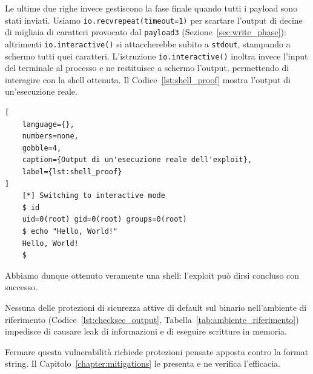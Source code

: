Le ultime due righe invece gestiscono la fase finale quando tutti i payload sono stati inviati. Usiamo \texttt{io.recvrepeat(timeout=1)} per scartare l'output di decine di migliaia di caratteri provocato dal \texttt{payload3} (Sezione~\ref{sec:write_phase}): altrimenti \texttt{io.interactive()} si attaccherebbe subito a \texttt{stdout}, stampando a schermo tutti quei caratteri. L'istruzione \texttt{io.interactive()} inoltra invece l'input del terminale al processo e ne restituisce a schermo l'output, permettendo di interagire con la shell ottenuta. Il Codice~\ref{lst:shell_proof} mostra l'output di un'esecuzione reale.
\begin{lstlisting}[
    language={},
    numbers=none,
    gobble=4,
    caption={Output di un'esecuzione reale dell'exploit},
    label={lst:shell_proof}
]
    [*] Switching to interactive mode
    $ id
    uid=0(root) gid=0(root) groups=0(root)
    $ echo "Hello, World!"
    Hello, World!
    $  
\end{lstlisting}
Abbiamo dunque ottenuto veramente una shell: l'exploit può dirsi concluso con successo.

Nessuna delle protezioni di sicurezza attive di default sul binario nell'ambiente di riferimento (Codice~\ref{lst:checksec_output}, Tabella~\ref{tab:ambiente_riferimento})  impedisce di causare leak di informazioni e di eseguire scritture in memoria.

Fermare questa vulnerabilità richiede protezioni pensate apposta contro la format string. Il Capitolo~\ref{chapter:mitigations} le presenta e ne verifica l'efficacia.
